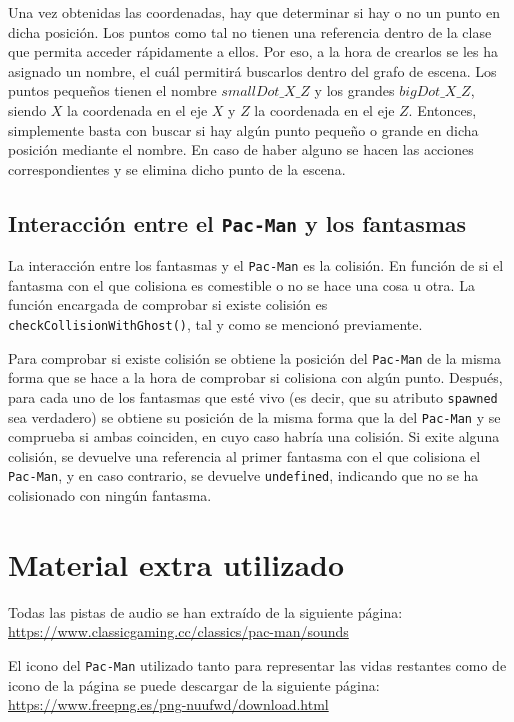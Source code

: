 \documentclass[11pt,a4paper]{article}
\begin{document}
Una vez obtenidas las coordenadas, hay que determinar si hay o no un punto en dicha posición.
Los puntos como tal no tienen una referencia dentro de la clase que permita acceder rápidamente
a ellos. Por eso, a la hora de crearlos se les ha asignado un nombre, el cuál permitirá buscarlos
dentro del grafo de escena. Los puntos pequeños tienen el nombre
$smallDot\_X\_Z$ y los grandes $bigDot\_X\_Z$, siendo $X$ la coordenada en el eje $X$ y
$Z$ la coordenada en el eje $Z$. Entonces, simplemente basta con buscar si hay algún punto
pequeño o grande en dicha posición mediante el nombre. En caso de haber alguno se hacen
las acciones correspondientes y se elimina dicho punto de la escena.

\subsection{Interacción entre el \texttt{Pac-Man} y los fantasmas}

La interacción entre los fantasmas y el \texttt{Pac-Man} es la colisión. En función de si el
fantasma con el que colisiona es comestible o no se hace una cosa u otra. La función encargada
de comprobar si existe colisión es \texttt{checkCollisionWithGhost()}, tal y como se mencionó
previamente.

Para comprobar si existe colisión se obtiene la posición del \texttt{Pac-Man} de la misma forma
que se hace a la hora de comprobar si colisiona con algún punto. Después, para cada uno
de los fantasmas que esté vivo (es decir, que su atributo \texttt{spawned} sea verdadero) se
obtiene su posición de la misma forma que la del \texttt{Pac-Man} y se comprueba si ambas
coinciden, en cuyo caso habría una colisión. Si exite alguna colisión, se devuelve una referencia
al primer fantasma con el que colisiona el \texttt{Pac-Man}, y en caso contrario, se devuelve
\texttt{undefined}, indicando que no se ha colisionado con ningún fantasma.

\section{Material extra utilizado}

Todas las pistas de audio se han extraído de la siguiente página:
\url{https://www.classicgaming.cc/classics/pac-man/sounds}

El icono del \texttt{Pac-Man} utilizado tanto para representar las vidas restantes como
de icono de la página se puede descargar de la siguiente página:
\url{https://www.freepng.es/png-nuufwd/download.html}
\end{document}
